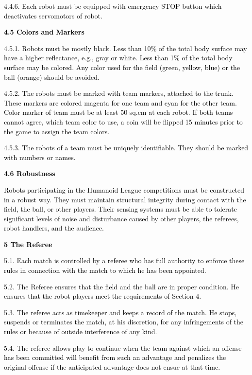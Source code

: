 \documentclass[a4paper]{article}
\begin{document}
\textcolor{black}{4.4.6. Each robot must be equipped with emergency STOP button which deactivates servomotors of robot.}


\bigskip

\textbf{\textcolor{black}{4.5 Colors and Markers}}

\textcolor{black}{4.5.1. Robots must be mostly black. Less than 10\% of the total body surface may have a higher
reflectance, e.g., gray or white. Less than 1\% of the total body surface may be colored. Any color used for the field
(green, yellow, blue) or the ball (orange) should be avoided.}

\textcolor{black}{4.5.2. The robots must be marked with team markers, attached to the trunk. These markers are colored
magenta for one team and cyan for the other team. Color marker of team must be at least 50 sq.cm at each robot. If both
teams cannot agree, which team color to use, a coin will be flipped 15 minutes prior to the game to assign the team
colors.}

\textcolor{black}{4.5.3. The robots of a team must be uniquely identifiable. They should be marked with numbers or
names.}


\bigskip

\textbf{\textcolor{black}{4.6 Robustness}}

\textcolor{black}{Robots participating in the Humanoid League competitions must be constructed in a robust way. They
must maintain structural integrity during contact with the field, the ball, or other players. Their sensing systems
must be able to tolerate significant levels of noise and disturbance caused by other players, the referees, robot
handlers, and the audience.}


\bigskip

\textbf{\textcolor{black}{5 The Referee}}

\textcolor{black}{5.1. Each match is controlled by a referee who has full authority to enforce these rules in connection
with the match to which he has been appointed.}

\textcolor{black}{5.2. The Referee ensures that the field and the ball are in proper condition. He ensures that the
robot players meet the requirements of Section 4.}

\textcolor{black}{5.3. The referee acts as timekeeper and keeps a record of the match. He stops, suspends or terminates
the match, at his discretion, for any infringements of the rules or because of outside interference of any kind.}

\textcolor{black}{5.4. The referee allows play to continue when the team against which an offense has been committed
will benefit from such an advantage and penalizes the original offense if the anticipated advantage does not ensue at
that time.}
\end{document}
